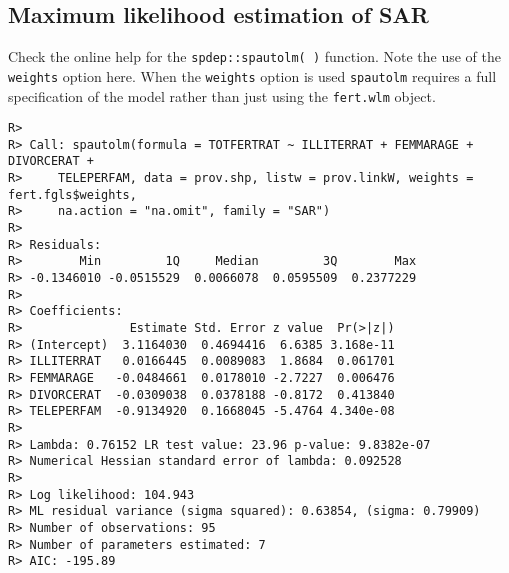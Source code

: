 \documentclass[
]{article}
\newenvironment{Shaded}{\begin{snugshade}}{\end{snugshade}}
\newcommand{\DataTypeTok}[1]{\textcolor[rgb]{0.13,0.29,0.53}{#1}}
\newcommand{\KeywordTok}[1]{\textcolor[rgb]{0.13,0.29,0.53}{\textbf{#1}}}
\newcommand{\NormalTok}[1]{#1}
\newcommand{\OperatorTok}[1]{\textcolor[rgb]{0.81,0.36,0.00}{\textbf{#1}}}
\newcommand{\StringTok}[1]{\textcolor[rgb]{0.31,0.60,0.02}{#1}}
\begin{document}
\hypertarget{maximum-likelihood-estimation-of-sar}{%
\subsection{Maximum likelihood estimation of
SAR}\label{maximum-likelihood-estimation-of-sar}}

Check the online help for the \texttt{spdep::spautolm(\ )} function.
Note the use of the \texttt{weights} option here. When the
\texttt{weights} option is used \texttt{spautolm} requires a full
specification of the model rather than just using the \texttt{fert.wlm}
object.

\begin{Shaded}
\end{Shaded}

\begin{verbatim}
R> 
R> Call: spautolm(formula = TOTFERTRAT ~ ILLITERRAT + FEMMARAGE + DIVORCERAT + 
R>     TELEPERFAM, data = prov.shp, listw = prov.linkW, weights = fert.fgls$weights, 
R>     na.action = "na.omit", family = "SAR")
R> 
R> Residuals:
R>        Min         1Q     Median         3Q        Max 
R> -0.1346010 -0.0515529  0.0066078  0.0595509  0.2377229 
R> 
R> Coefficients: 
R>               Estimate Std. Error z value  Pr(>|z|)
R> (Intercept)  3.1164030  0.4694416  6.6385 3.168e-11
R> ILLITERRAT   0.0166445  0.0089083  1.8684  0.061701
R> FEMMARAGE   -0.0484661  0.0178010 -2.7227  0.006476
R> DIVORCERAT  -0.0309038  0.0378188 -0.8172  0.413840
R> TELEPERFAM  -0.9134920  0.1668045 -5.4764 4.340e-08
R> 
R> Lambda: 0.76152 LR test value: 23.96 p-value: 9.8382e-07 
R> Numerical Hessian standard error of lambda: 0.092528 
R> 
R> Log likelihood: 104.943 
R> ML residual variance (sigma squared): 0.63854, (sigma: 0.79909)
R> Number of observations: 95 
R> Number of parameters estimated: 7 
R> AIC: -195.89
\end{verbatim}
\end{document}
